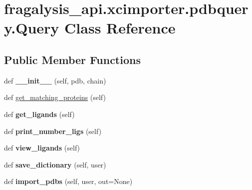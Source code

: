 \hypertarget{classfragalysis__api_1_1xcimporter_1_1pdbquery_1_1_query}{}\section{fragalysis\+\_\+api.\+xcimporter.\+pdbquery.\+Query Class Reference}
\label{classfragalysis__api_1_1xcimporter_1_1pdbquery_1_1_query}
\subsection*{Public Member Functions}
\begin{DoxyCompactItemize}
\item 
\mbox{\label{classfragalysis__api_1_1xcimporter_1_1pdbquery_1_1_query_a4c9143433e01d6c355246e1ea4f86265}} 
def {\bfseries \+\_\+\+\_\+init\+\_\+\+\_\+} (self, pdb, chain)
\item 
def \hyperlink{classfragalysis__api_1_1xcimporter_1_1pdbquery_1_1_query_a0beef45de2126a3837b02050e1b90a74}{get\+\_\+matching\+\_\+proteins} (self)
\item 
\mbox{\label{classfragalysis__api_1_1xcimporter_1_1pdbquery_1_1_query_a846d2bc401e56a452222d95b630fb9b0}} 
def {\bfseries get\+\_\+ligands} (self)
\item 
\mbox{\label{classfragalysis__api_1_1xcimporter_1_1pdbquery_1_1_query_a36dfa365ad219285d470107eba4e7080}} 
def {\bfseries print\+\_\+number\+\_\+ligs} (self)
\item 
\mbox{\label{classfragalysis__api_1_1xcimporter_1_1pdbquery_1_1_query_ada4ce4d98d911a33baabe42bf38a4aa1}} 
def {\bfseries view\+\_\+ligands} (self)
\item 
\mbox{\label{classfragalysis__api_1_1xcimporter_1_1pdbquery_1_1_query_a42babe6a340aaf0b2dcc84ea5d0c0b11}} 
def {\bfseries save\+\_\+dictionary} (self, user)
\item 
\mbox{\label{classfragalysis__api_1_1xcimporter_1_1pdbquery_1_1_query_a5be8d71963fc482622a0b1167636718c}} 
def {\bfseries import\+\_\+pdbs} (self, user, out=None)
\end{DoxyCompactItemize}
